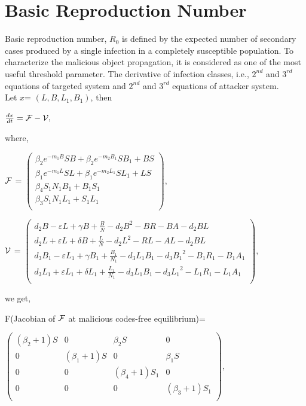 \section{Basic Reproduction Number}
Basic reproduction number, $R_{0}$ is defined by the expected number of secondary cases produced by a single infection in a completely susceptible population. To characterize the malicious object propagation, it is considered as one of the most useful threshold parameter. The derivative of infection classes, i.e., $2^{nd}$ and $3^{rd}$ equations of targeted system and $2^{nd}$ and $3^{rd}$ equations of attacker system.\\
Let $x$= $(L, B, L_{1}, B_{1})$, then

$\frac{dx}{dt} = \cal{F}-\cal{V},$

\noindent where,

$\cal{F}$ =
    ${\left(
    \begin{array}{c}
      {\beta}_2 e^{-m_1 B} S B+{\beta}_2 e^{-m_2 B_1} S B_1+B S \\
      {\beta}_1 e^{-m_1 L} S L+{\beta}_1 e^{-m_2 L_1} S L_1+L S  \\
      {\beta}_4 S_1 N_1 B_1+B_1 S_1 \\
      {\beta}_3 S_1 N_1 L_1+S_1 L_1 \\
    \end{array}
  \right) },$


 $\cal{V}$ =
 ${\left(
   \begin{array}{c}
     d_2 B -\varepsilon L +\gamma B +\frac{B}{N} -d_2 B^2 -B R - B A - d_2 B L \\
     d_2 L +\varepsilon L +\delta B +\frac{L}{N} -d_2 L^2 - R L - A L - d_2 B L \\
     d_3 B_1 - \varepsilon L_1+\gamma B_1 +\frac{B_1}{N_1}-d_3 L_1 B_1 -d_3 {B_1}^2 -B_1 R_1 -B_1 A_1 \\
     d_3 L_1 + \varepsilon L_1+\delta L_1 +\frac{L_1}{N_1}-d_3 L_1 B_1 -d_3 {L_1}^2 -L_1 R_1 -L_1 A_1 \\
   \end{array}
 \right)},$

 \noindent we get,

\noindent F(Jacobian of $\cal{F}$  at malicious codes-free equilibrium)=

     $\left(
       \begin{array}{cccc}
         ({\beta}_2+1) S & 0 & {\beta}_2 S & 0 \\
         0 & ({\beta}_1+1) S & 0 & {\beta}_1 S \\
         0 & 0 & ({\beta}_4+1) S_1 & 0 \\
         0 & 0 & 0 & ({\beta}_3+1) S_1 \\
       \end{array}
     \right),$

